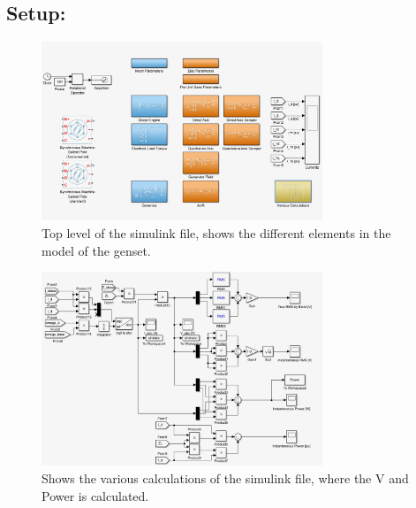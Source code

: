 \subsection*{Setup:}

\begin{figure}[H]
\centering
\includegraphics[width=0.75\textwidth]{rapport/billeder/simulink_puOpenLoopDamper}
\caption{Top level of the simulink file, shows the different elements in the model of the genset.}
\label{fig:simulink_puOpenLoopDamper}
\end{figure}

\begin{figure}[H]
\centering
\includegraphics[width=0.75\textwidth]{rapport/billeder/simulink_various_calculations}
\caption{Shows the various calculations of the simulink file, where the V and Power is calculated.}
\label{fig:simulink_various_calculations}
\end{figure}

